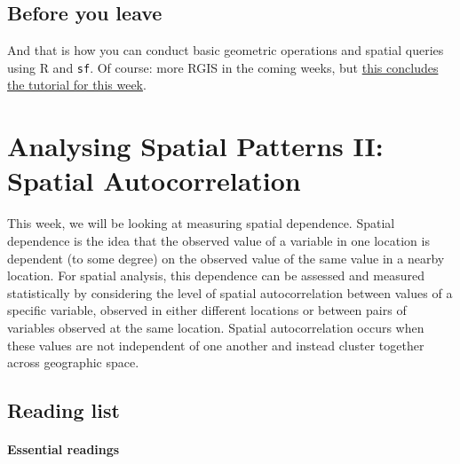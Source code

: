 \documentclass[
]{book}
\begin{document}
\hypertarget{byl-w06}{%
\section{Before you leave}\label{byl-w06}}

And that is how you can conduct basic geometric operations and spatial queries using R and \texttt{sf}. Of course: more RGIS in the coming weeks, but \href{https://www.youtube.com/watch?v=Ydg4T2MP7Z8}{this concludes the tutorial for this week}.

\hypertarget{analysing-spatial-patterns-ii-spatial-autocorrelation}{%
\chapter{Analysing Spatial Patterns II: Spatial Autocorrelation}\label{analysing-spatial-patterns-ii-spatial-autocorrelation}}

This week, we will be looking at measuring spatial dependence. Spatial dependence is the idea that the observed value of a variable in one location is dependent (to some degree) on the observed value of the same value in a nearby location. For spatial analysis, this dependence can be assessed and measured statistically by considering the level of spatial autocorrelation between values of a specific variable, observed in either different locations or between pairs of variables observed at the same location. Spatial autocorrelation occurs when these values are not independent of one another and instead cluster together across geographic space.

\hypertarget{reading-w07}{%
\section{Reading list}\label{reading-w07}}

\hypertarget{essential-readings-6}{%
\subsubsection*{Essential readings}\label{essential-readings-6}}
\end{document}
